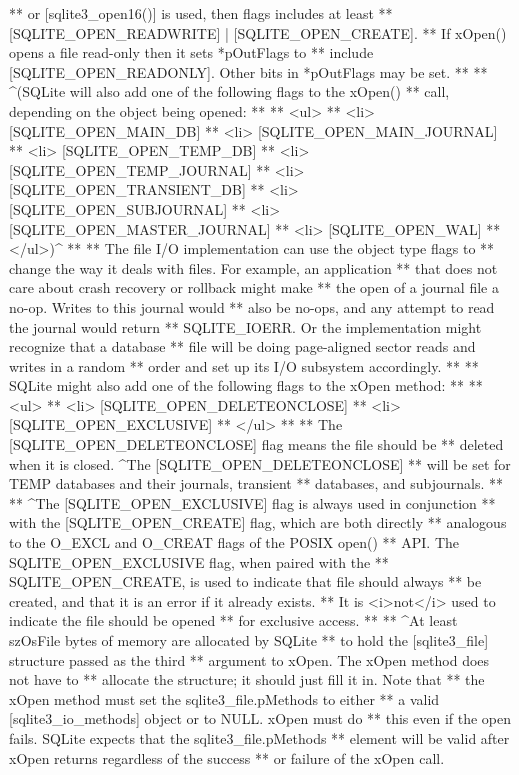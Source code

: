 \begin{Codex}[label=sqlite3.h,numbers=left]
{** or [sqlite3_open16()] is used, then flags includes at least
** [SQLITE_OPEN_READWRITE] | [SQLITE_OPEN_CREATE]. 
** If xOpen() opens a file read-only then it sets *pOutFlags to
** include [SQLITE_OPEN_READONLY].  Other bits in *pOutFlags may be set.
**
** ^(SQLite will also add one of the following flags to the xOpen()
** call, depending on the object being opened:
**
** <ul>
** <li>  [SQLITE_OPEN_MAIN_DB]
** <li>  [SQLITE_OPEN_MAIN_JOURNAL]
** <li>  [SQLITE_OPEN_TEMP_DB]
** <li>  [SQLITE_OPEN_TEMP_JOURNAL]
** <li>  [SQLITE_OPEN_TRANSIENT_DB]
** <li>  [SQLITE_OPEN_SUBJOURNAL]
** <li>  [SQLITE_OPEN_MASTER_JOURNAL]
** <li>  [SQLITE_OPEN_WAL]
** </ul>)^
**
** The file I/O implementation can use the object type flags to
** change the way it deals with files.  For example, an application
** that does not care about crash recovery or rollback might make
** the open of a journal file a no-op.  Writes to this journal would
** also be no-ops, and any attempt to read the journal would return
** SQLITE_IOERR.  Or the implementation might recognize that a database
** file will be doing page-aligned sector reads and writes in a random
** order and set up its I/O subsystem accordingly.
**
** SQLite might also add one of the following flags to the xOpen method:
**
** <ul>
** <li> [SQLITE_OPEN_DELETEONCLOSE]
** <li> [SQLITE_OPEN_EXCLUSIVE]
** </ul>
**
** The [SQLITE_OPEN_DELETEONCLOSE] flag means the file should be
** deleted when it is closed.  ^The [SQLITE_OPEN_DELETEONCLOSE]
** will be set for TEMP databases and their journals, transient
** databases, and subjournals.
**
** ^The [SQLITE_OPEN_EXCLUSIVE] flag is always used in conjunction
** with the [SQLITE_OPEN_CREATE] flag, which are both directly
** analogous to the O_EXCL and O_CREAT flags of the POSIX open()
** API.  The SQLITE_OPEN_EXCLUSIVE flag, when paired with the 
** SQLITE_OPEN_CREATE, is used to indicate that file should always
** be created, and that it is an error if it already exists.
** It is <i>not</i> used to indicate the file should be opened 
** for exclusive access.
**
** ^At least szOsFile bytes of memory are allocated by SQLite
** to hold the  [sqlite3_file] structure passed as the third
** argument to xOpen.  The xOpen method does not have to
** allocate the structure; it should just fill it in.  Note that
** the xOpen method must set the sqlite3_file.pMethods to either
** a valid [sqlite3_io_methods] object or to NULL.  xOpen must do
** this even if the open fails.  SQLite expects that the sqlite3_file.pMethods
** element will be valid after xOpen returns regardless of the success
** or failure of the xOpen call.
}
\end{Codex}
